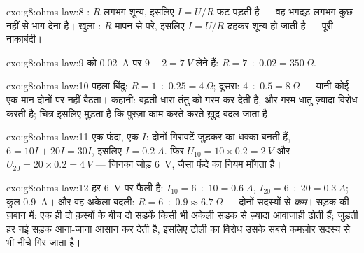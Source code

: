 \begin{solution}{exo:g8:ohms-law:8}
: $R$ लगभग शून्य, इसलिए $I = U/R$ फट पड़ती है --- वह भगदड़
लगभग-कुछ-नहीं से भाग देना है। खुला : $R$ मापन से परे, इसलिए
$I = U/R$ ढहकर शून्य हो जाती है --- पूरी नाकाबंदी।
\end{solution}

\begin{solution}{exo:g8:ohms-law:9}
 को \qty{0.02}{A} पर $9 - 2 = \qty{7}{V}$ लेने हैं:
$R = 7 \div 0.02 = 350\,\Omega$.
\end{solution}

\begin{solution}{exo:g8:ohms-law:10}
पहला बिंदु: $R = 1 \div 0.25 = 4\,\Omega$; दूसरा: $4 \div 0.5 =
8\,\Omega$ --- यानी कोई एक मान दोनों पर नहीं बैठता। कहानी: बढ़ती धारा
तंतु को गरम कर देती है, और गरम धातु ज़्यादा विरोध करती है; चित्र
इसलिए मुड़ता है कि पुरज़ा काम करते-करते ख़ुद बदल जाता है।
\end{solution}

\begin{solution}{exo:g8:ohms-law:11}
एक फंदा, एक $I$: दोनों गिरावटें जुड़कर  का धक्का बनती हैं,
$6 = 10 I + 20 I = 30 I$, इसलिए $I = \qty{0.2}{A}$. फिर $U_{10} =
10 \times 0.2 = \qty{2}{V}$ और $U_{20} = 20 \times 0.2 =
\qty{4}{V}$ --- जिनका जोड़ \qty{6}{V}, जैसा फंदे का नियम माँगता है।
\end{solution}

\begin{solution}{exo:g8:ohms-law:12}
हर  \qty{6}{V} पर फैली है: $I_{10} = 6 \div 10 = \qty{0.6}{A}$,
$I_{20} = 6 \div 20 = \qty{0.3}{A}$; कुल \qty{0.9}{A}। और वह अकेला
बदली: $R = 6 \div 0.9 \approx 6.7\,\Omega$ --- दोनों सदस्यों से
\emph{कम}। सड़क की ज़बान में: एक ही दो क़स्बों के बीच दो सड़कें किसी
भी अकेली सड़क से ज़्यादा आवाजाही ढोती हैं;  जुड़ती हर नई
सड़क आना-जाना आसान कर देती है, इसलिए टोली का विरोध उसके सबसे कमज़ोर
सदस्य से भी नीचे गिर जाता है।
\end{solution}

